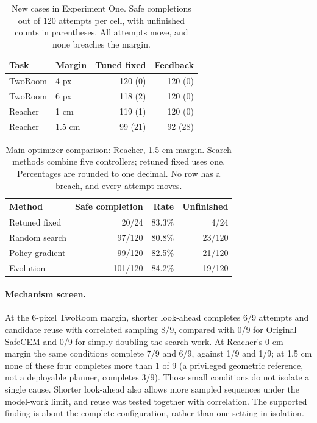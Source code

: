 \documentclass[sigconf,nonacm]{acmart}
\begin{document}
\begin{table}[htbp]
\caption{New cases in Experiment One. Safe completions out of 120 attempts
per cell, with unfinished counts in parentheses. All attempts move, and
none breaches the margin.}
\label{tab:fresh}\centering\small
\begin{tabular}{llrr}
\toprule
Task & Margin & Tuned fixed & Feedback \\
\midrule
TwoRoom & 4 px & 120 (0) & 120 (0) \\
TwoRoom & 6 px & 118 (2) & 120 (0) \\
Reacher & 1 cm & 119 (1) & 120 (0) \\
Reacher & 1.5 cm & 99 (21) & 92 (28) \\
\bottomrule
\end{tabular}
\end{table}

\begin{table}[htbp]
\caption{Main optimizer comparison: Reacher, 1.5 cm margin. Search methods
combine five controllers; retuned fixed uses one. Percentages are rounded to one decimal.
No row has a breach, and every attempt moves.}
\label{tab:primary}\centering\small
\begin{tabular}{lrrr}
\toprule
Method & Safe completion & Rate & Unfinished \\
\midrule
Retuned fixed & 20/24 & 83.3\% & 4/24 \\
Random search & 97/120 & 80.8\% & 23/120 \\
Policy gradient & 99/120 & 82.5\% & 21/120 \\
Evolution & 101/120 & 84.2\% & 19/120 \\
\bottomrule
\end{tabular}
\end{table}

\paragraph{Mechanism screen.} At the 6-pixel TwoRoom margin, shorter
look-ahead completes 6/9 attempts and candidate reuse with correlated
sampling 8/9, compared with 0/9 for Original SafeCEM and 0/9 for simply
doubling the search work. At Reacher's 0 cm margin the same conditions
complete 7/9 and 6/9, against 1/9 and 1/9; at 1.5 cm none of these four completes more than 1 of 9 (a privileged
geometric reference, not a deployable planner, completes 3/9). Those small conditions do not
isolate a single cause. Shorter look-ahead also allows more sampled
sequences under the model-work limit, and reuse was tested together with
correlation. The supported finding is about the complete configuration,
rather than one setting in isolation.
\end{document}
